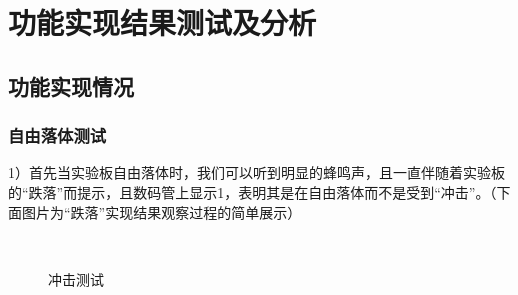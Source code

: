 \section{功能实现结果测试及分析}
\subsection{功能实现情况}
\subsubsection{自由落体测试}
\par{1）首先当实验板自由落体时，我们可以听到明显的蜂鸣声，且一直伴随着实验板的“跌落”而提示，且数码管上显示1，表明其是在自由落体而不是受到“冲击”。（下面图片为“跌落”实现结果观察过程的简单展示）}

\begin{figure}[htbp]
\centering

%
\\
%

\centering
\caption{冲击测试}\label{fig:5.2}
\end{figure}

